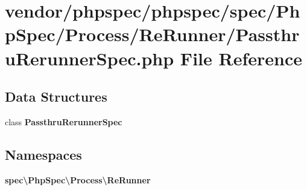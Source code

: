 \section{vendor/phpspec/phpspec/spec/\+Php\+Spec/\+Process/\+Re\+Runner/\+Passthru\+Rerunner\+Spec.php File Reference}
\label{_passthru_rerunner_spec_8php}
\subsection*{Data Structures}
\begin{DoxyCompactItemize}
\item 
class {\bf Passthru\+Rerunner\+Spec}
\end{DoxyCompactItemize}
\subsection*{Namespaces}
\begin{DoxyCompactItemize}
\item 
 {\bf spec\textbackslash{}\+Php\+Spec\textbackslash{}\+Process\textbackslash{}\+Re\+Runner}
\end{DoxyCompactItemize}
